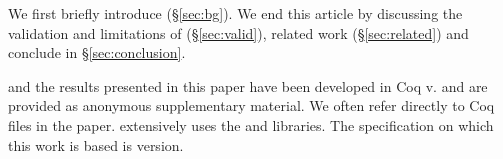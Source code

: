 We first briefly introduce \gql (\S\ref{sec:bg}). 
We end this article by discussing the validation and limitations of \gcoql (\S\ref{sec:valid}), related work (\S\ref{sec:related}) and conclude in \S\ref{sec:conclusion}.

\gcoql and the results presented in this paper have been developed in Coq v. and are provided as anonymous supplementary material. We often refer directly to Coq files in the paper. \gcoql extensively uses the 
\ssreflect {} and \equations {} libraries. 
The \gql specification on which this work is based is version.




